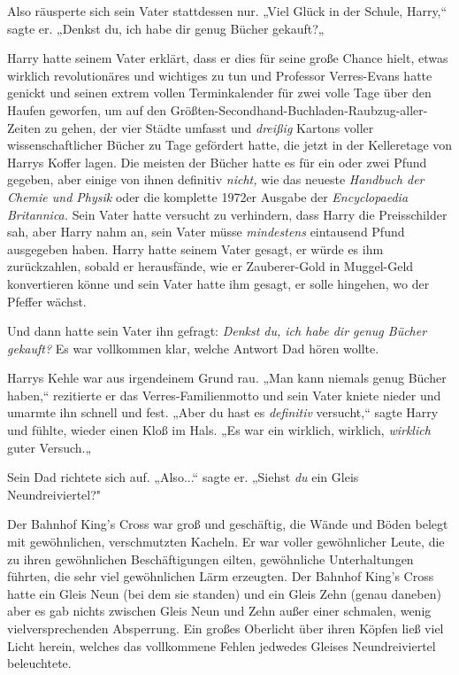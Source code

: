 {Also räusperte sich sein Vater stattdessen nur. „Viel Glück in der Schule, Harry,“ sagte er. „Denkst du, ich habe dir genug Bücher gekauft?„

Harry hatte seinem Vater erklärt, dass er dies für seine große Chance hielt, etwas wirklich revolutionäres und wichtiges zu tun und Professor Verres-Evans hatte genickt und seinen extrem vollen Terminkalender für zwei volle Tage über den Haufen geworfen, um auf den Größten-Secondhand-Buchladen-Raubzug-aller-Zeiten zu gehen, der vier Städte umfasst und \emph{dreißig} Kartons voller wissenschaftlicher Bücher zu Tage gefördert hatte, die jetzt in der Kelleretage von Harrys Koffer lagen. Die meisten der Bücher hatte es für ein oder zwei Pfund gegeben, aber einige von ihnen definitiv \emph{nicht,} wie das neueste \emph{Handbuch der Chemie und Physik} oder die komplette 1972er Ausgabe der \emph{Encyclopaedia Britannica.} Sein Vater hatte versucht zu verhindern, dass Harry die Preisschilder sah, aber Harry nahm an, sein Vater müsse \emph{mindestens} eintausend Pfund ausgegeben haben. Harry hatte seinem Vater gesagt, er würde es ihm zurückzahlen, sobald er herausfände, wie er Zauberer-Gold in Muggel-Geld konvertieren könne und sein Vater hatte ihm gesagt, er solle hingehen, wo der Pfeffer wächst.

Und dann hatte sein Vater ihn gefragt: \emph{Denkst du, ich habe dir genug Bücher gekauft?} Es war vollkommen klar, welche Antwort Dad hören wollte.

Harrys Kehle war aus irgendeinem Grund rau. „Man kann niemals genug Bücher haben,“ rezitierte er das Verres-Familienmotto und sein Vater kniete nieder und umarmte ihn schnell und fest. „Aber du hast es \emph{definitiv} versucht,“ sagte Harry und fühlte, wieder einen Kloß im Hals. „Es war ein wirklich, wirklich, \emph{wirklich} guter Versuch.„

Sein Dad richtete sich auf. „Also...“ sagte er. „Siehst \emph{du} ein Gleis Neundreiviertel?"

Der Bahnhof King's Cross war groß und geschäftig, die Wände und Böden belegt mit gewöhnlichen, verschmutzten Kacheln. Er war voller gewöhnlicher Leute, die zu ihren gewöhnlichen Beschäftigungen eilten, gewöhnliche Unterhaltungen führten, die sehr viel gewöhnlichen Lärm erzeugten. Der Bahnhof King's Cross hatte ein Gleis Neun (bei dem sie standen) und ein Gleis Zehn (genau daneben) aber es gab nichts zwischen Gleis Neun und Zehn außer einer schmalen, wenig vielversprechenden Absperrung. Ein großes Oberlicht über ihren Köpfen ließ viel Licht herein, welches das vollkommene Fehlen jedwedes Gleises Neundreiviertel beleuchtete.

}

